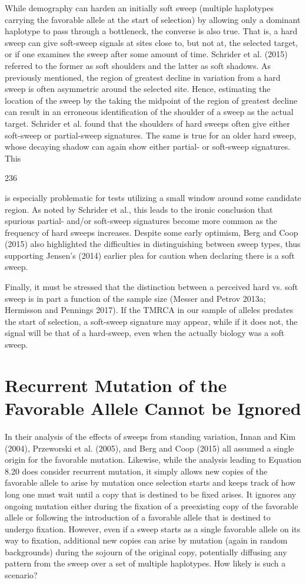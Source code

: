 \documentclass{article}
\begin{document}
While demography can harden an initially soft sweep (multiple haplotypes carrying the favorable allele at the start of selection) by allowing only a dominant haplotype to pass through a bottleneck, the converse is also true. That is, a hard sweep can give soft-sweep signals at sites close to, but not at, the selected target, or if one examines the sweep after some amount of time. Schrider et al. (2015) referred to the former as soft shoulders and the latter as soft shadows. As previously mentioned, the region of greatest decline in variation from a hard sweep is often asymmetric around the selected site. Hence, estimating the location of the sweep by the taking the midpoint of the region of greatest decline can result in an erroneous identification of the shoulder of a sweep as the actual target. Schrider et al. found that the shoulders of hard sweeps often give either soft-sweep or partial-sweep signatures. The same is true for an older hard sweep, whose decaying shadow can again show either partial- or soft-sweep signatures. This

236

is especially problematic for tests utilizing a small window around some candidate region. As noted by Schrider et al., this leads to the ironic conclusion that spurious partial- and/or soft-sweep signatures become more common as the frequency of hard sweeps increases. Despite some early optimism, Berg and Coop (2015) also highlighted the difficulties in distinguishing between sweep types, thus supporting Jensen's (2014) earlier plea for caution when declaring there is a soft sweep.

Finally, it must be stressed that the distinction between a perceived hard vs. soft sweep is in part a function of the sample size (Messer and Petrov 2013a; Hermisson and Pennings 2017). If the TMRCA in our sample of alleles predates the start of selection, a soft-sweep signature may appear, while if it does not, the signal will be that of a hard-sweep, even when the actually biology was a soft sweep.

\section{Recurrent Mutation of the Favorable Allele Cannot be Ignored}
In their analysis of the effects of sweeps from standing variation, Innan and Kim (2004), Przeworski et al. (2005), and Berg and Coop (2015) all assumed a single origin for the favorable mutation. Likewise, while the analysis leading to Equation 8.20 does consider recurrent mutation, it simply allows new copies of the favorable allele to arise by mutation once selection starts and keeps track of how long one must wait until a copy that is destined to be fixed arises. It ignores any ongoing mutation either during the fixation of a preexisting copy of the favorable allele or following the introduction of a favorable allele that is destined to undergo fixation. However, even if a sweep starts as a single favorable allele on its way to fixation, additional new copies can arise by mutation (again in random backgrounds) during the sojourn of the original copy, potentially diffusing any pattern from the sweep over a set of multiple haplotypes. How likely is such a scenario?
\end{document}
